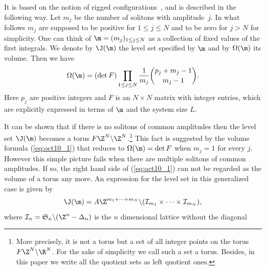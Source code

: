It is based on the notion of rigged conf\/igurations~\mbox{\cite{KKR,KR}}, and is described in the following way.
Let $m_j$ be the number of solitons with amplitude~$j$.
In what follows $m_j$ are supposed to be positive for $1 \leq j \leq N$ and to be zero for $j > N$ for simplicity.
One can think of $\m=(m_j)_{1 \leq j \leq N}$ as a collection of f\/ixed values of the f\/irst integrals.
We denote by $\J (\m)$ the level set specif\/ied by $\m$
and by $\Omega(\m)$
its volume.
Then we have \cite{KTT}
\begin{equation}
\Omega(\m) =
(\det F)\prod_{1 \leq j \leq N} \frac{1}{m_j}
\binom{p_j + m_j - 1}{m_j - 1}.\label{eq:oct10_1}
\end{equation}
Here $p_j$ are positive integers and $F$ is an $N \times N$ matrix with integer entries,
which are explicitly expressed in terms of $\m$ and the system size $L$.

{It can be shown that}
if there is no solitons of common amplitudes then
the level set $\J (\m)$ becomes a torus $F \Z^N \backslash \Z^N $.\footnote{More precisely, it is not a torus but a set of all integer points on the torus $F \Z^N \backslash \R^N $.
For the sake of simplicity we call such a set a torus.
Besides, in this paper we write all the quotient sets as left quotient ones.}
This fact is suggested by
the volume formula (\ref{eq:oct10_1}) that reduces to $\Omega(\m) =\det F$ when $m_j=1$ for every $j$.
However this simple picture fails when there are multiple solitons of common amplitudes.
{If so,} the right hand side of (\ref{eq:oct10_1}) can not be regarded as the volume of a torus any more.
{An expression for} the level set in this generalized case is given by
\begin{equation}\label{eq:jv}
\J (\m) =  A \Z^{m_1+\cdots + m_{N}} \backslash ({\mathcal I}_{m_1}\times
\cdots \times {\mathcal I}_{m_N}),
\end{equation}
where ${\mathcal I}_n = {\mathfrak S}_n \backslash (\Z^n-\Delta_n)$ is
the $n$ dimensional lattice without the diagonal
